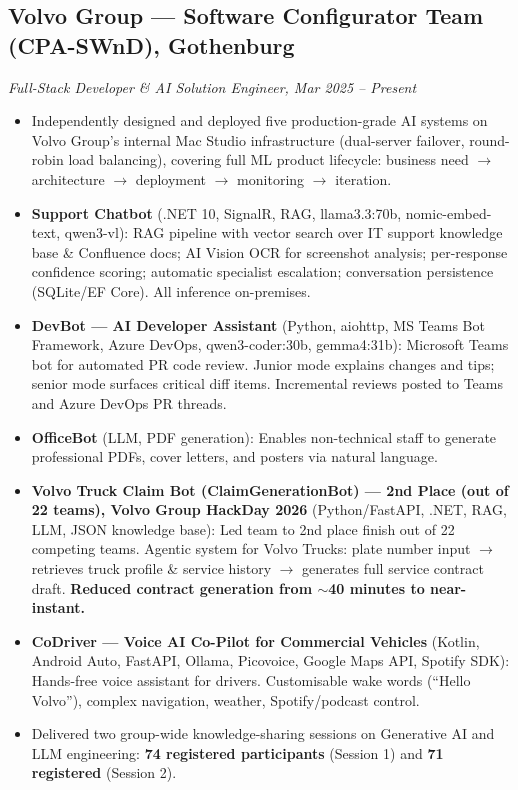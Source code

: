 \documentclass[a4paper,10pt]{article}
\begin{document}
\subsection*{Volvo Group --- Software Configurator Team (CPA-SWnD), Gothenburg}
\textit{Full-Stack Developer \& AI Solution Engineer, Mar 2025 -- Present}
\begin{itemize}[noitemsep]
  \item Independently designed and deployed five production-grade AI systems on Volvo Group's internal Mac Studio infrastructure (dual-server failover, round-robin load balancing), covering full ML product lifecycle: business need $\to$ architecture $\to$ deployment $\to$ monitoring $\to$ iteration.
  \item \textbf{Support Chatbot} (.NET 10, SignalR, RAG, llama3.3:70b, nomic-embed-text, qwen3-vl): RAG pipeline with vector search over IT support knowledge base \& Confluence docs; AI Vision OCR for screenshot analysis; per-response confidence scoring; automatic specialist escalation; conversation persistence (SQLite/EF Core). All inference on-premises.
  \item \textbf{DevBot --- AI Developer Assistant} (Python, aiohttp, MS Teams Bot Framework, Azure DevOps, qwen3-coder:30b, gemma4:31b): Microsoft Teams bot for automated PR code review. Junior mode explains changes and tips; senior mode surfaces critical diff items. Incremental reviews posted to Teams and Azure DevOps PR threads.
  \item \textbf{OfficeBot} (LLM, PDF generation): Enables non-technical staff to generate professional PDFs, cover letters, and posters via natural language.
  \item \textbf{Volvo Truck Claim Bot (ClaimGenerationBot) --- 2nd Place (out of 22 teams), Volvo Group HackDay 2026} (Python/FastAPI, .NET, RAG, LLM, JSON knowledge base): Led team to 2nd place finish out of 22 competing teams. Agentic system for Volvo Trucks: plate number input $\to$ retrieves truck profile \& service history $\to$ generates full service contract draft. \textbf{Reduced contract generation from $\sim$40 minutes to near-instant.}
  \item \textbf{CoDriver --- Voice AI Co-Pilot for Commercial Vehicles} (Kotlin, Android Auto, FastAPI, Ollama, Picovoice, Google Maps API, Spotify SDK): Hands-free voice assistant for drivers. Customisable wake words (``Hello Volvo''), complex navigation, weather, Spotify/podcast control.
  \item Delivered two group-wide knowledge-sharing sessions on Generative AI and LLM engineering: \textbf{74 registered participants} (Session 1) and \textbf{71 registered} (Session 2).
\end{itemize}
\end{document}
